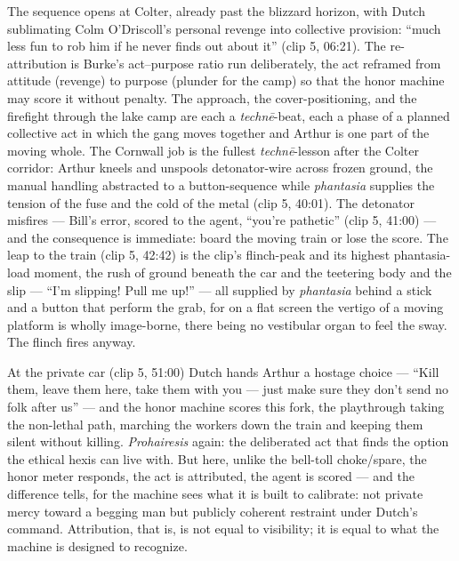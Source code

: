 \documentclass{article}
\begin{document}
The sequence opens at Colter, already past the blizzard horizon, with Dutch sublimating Colm O'Driscoll's personal revenge into collective provision: ``much less fun to rob him if he never finds out about it'' (clip 5, 06:21). The re-attribution is Burke's act–purpose ratio run deliberately, the act reframed from attitude (revenge) to purpose (plunder for the camp) so that the honor machine may score it without penalty. The approach, the cover-positioning, and the firefight through the lake camp are each a \textit{technē}-beat, each a phase of a planned collective act in which the gang moves together and Arthur is one part of the moving whole. The Cornwall job is the fullest \textit{technē}-lesson after the Colter corridor: Arthur kneels and unspools detonator-wire across frozen ground, the manual handling abstracted to a button-sequence while \textit{phantasia} supplies the tension of the fuse and the cold of the metal (clip 5, 40:01). The detonator misfires — Bill's error, scored to the agent, ``you're pathetic'' (clip 5, 41:00) — and the consequence is immediate: board the moving train or lose the score. The leap to the train (clip 5, 42:42) is the clip's flinch-peak and its highest phantasia-load moment, the rush of ground beneath the car and the teetering body and the slip — ``I'm slipping! Pull me up!'' — all supplied by \textit{phantasia} behind a stick and a button that perform the grab, for on a flat screen the vertigo of a moving platform is wholly image-borne, there being no vestibular organ to feel the sway. The flinch fires anyway.

At the private car (clip 5, 51:00) Dutch hands Arthur a hostage choice — ``Kill them, leave them here, take them with you — just make sure they don't send no folk after us'' — and the honor machine scores this fork, the playthrough taking the non-lethal path, marching the workers down the train and keeping them silent without killing. \textit{Prohairesis} again: the deliberated act that finds the option the ethical hexis can live with. But here, unlike the bell-toll choke/spare, the honor meter responds, the act is attributed, the agent is scored — and the difference tells, for the machine sees what it is built to calibrate: not private mercy toward a begging man but publicly coherent restraint under Dutch's command. Attribution, that is, is not equal to visibility; it is equal to what the machine is designed to recognize.
\end{document}
